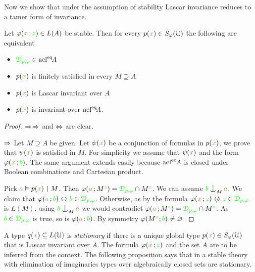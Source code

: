 Now we show that under the assumption of stability Lascar invariance reduces to a tamer form of invariance.

\begin{proposition}\label{prop_type_over_acl2}
  Let $\varphi({\color{brown} x}\,;{\color{green} z})\in L(A)$ be stable.
  Then for every $p({\color{brown} x})\in S_\varphi(\EuScript U)$ the following are equivalent
  \begin{itemize}
  \item[1.] ${\color{green}\EuScript D_{p,\varphi}}\in {\rm acl}^{{\rm eq}}\!A$
  \item[2.] $p({\color{brown} x})$ is finitely satisfied in every $M\supseteq A$
  \item[3.] $p({\color{brown} x})$ is Lascar invariant over $A$
  \item[4.] $p({\color{brown} x})$ is invariant over ${\rm acl}^{{\rm eq}}\!A$.
  \end{itemize}
\end{proposition}
\begin{proof}
  $\Rightarrow$$\Rightarrow$ and $\Leftrightarrow$ are clear.

  $\Rightarrow$
  Let $M\supseteq A$ be given.
  Let $\psi({\color{brown} x})$ be a conjunction of formulas in $p({\color{brown} x})$, we prove that $\psi({\color{brown} x})$ is satisfied in $M$.
  For simplicity we assume that $\psi({\color{brown} x})$ and the form $\varphi({\color{brown} x}\,;{\color{green} b})$.
  The same argument extends easily because ${\rm acl}^{{\rm eq}}\!A$ is closed under Boolean combinations and Cartesian product.

  Pick ${\color{brown} a}\vDash p({\color{brown} x})\restriction M$.
  Then $\varphi({\color{brown} a}\,;M^{\color{green} z})={\color{green}\EuScript D_{p,\varphi}}\cap M^{\color{green} z}$.
  We can assume ${\gr b}\nonfork_M{\mr a}$.
  We claim that $\varphi({\color{brown} a}\,;{\color{green} b})\leftrightarrow{\color{green}b}\in{\color{green}\EuScript D_{p,\varphi}}$.
  Otherwise, as by  the formula $\phi({\mr x}\,;{\gr z})\niff{\gr z}\in{\gr\D_{p,\phi}}$ is $L(M)$, using ${\gr b}\nonfork_M{\mr a}$ we would contradict $\varphi({\color{brown} a}\,;M^{\color{green} z})={\color{green}\EuScript D_{p,\varphi}}\cap M^{\color{green} z}$.
  As ${\color{green} b}\in{\color{green}\EuScript D_{p,\varphi}}$ is true, so is $\varphi({\color{brown} a}\,;{\color{green} b})$.
  By symmetry $\varphi(M^{\color{brown} x};{\color{green} b})\neq\varnothing$.
\end{proof}

A type $q({\color{brown} x})\subseteq L(\EuScript U)$ is \emph{stationary\/} if there is a unique global type $p({\color{brown} x})\in S_\varphi(\EuScript U)$ that is Lascar invariant over $A$.
The formula $\varphi({\color{brown} x}\,;{\color{green} z})$ and the set $A$ are to be inferred from the context.
The following proposition says that in a stable theory with elimination of imaginaries types over algebraically closed sets are stationary.


